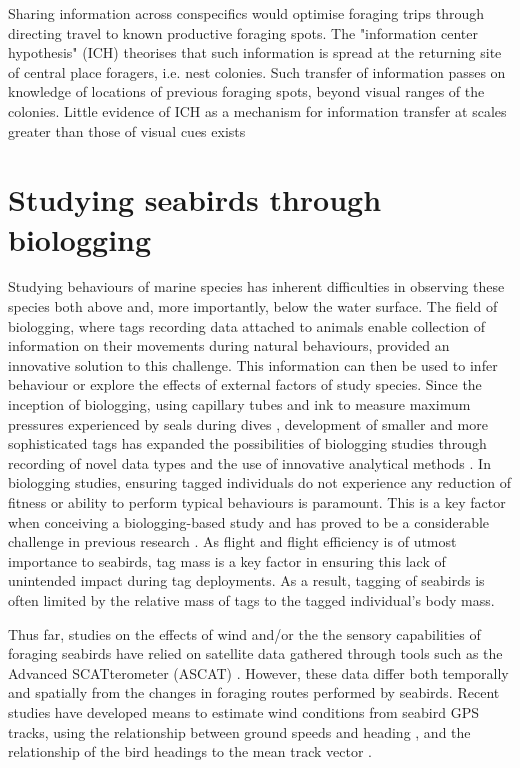 \documentclass[9pt,twocolumn,twoside,lineno]{pnas-new}
\begin{document}

Sharing information across conspecifics would optimise foraging trips through directing travel to known productive foraging spots. The "information center hypothesis" (ICH) theorises that such information is spread at the returning site of central place foragers, i.e. nest colonies. Such transfer of information passes on knowledge of locations of previous foraging spots, beyond visual ranges of the colonies. Little evidence of ICH as a mechanism for information transfer at scales greater than those of visual cues exists \citep{Davoren_2003} 

\section{Studying seabirds through biologging}
Studying behaviours of marine species has inherent difficulties in observing these species both above and, more importantly, below the water surface. The field of biologging, where tags recording data attached to animals enable collection of information on their movements during natural behaviours, provided an innovative solution to this challenge. This information can then be used to infer behaviour or explore the effects of external factors of study species. Since the inception of biologging, using capillary tubes and ink to measure maximum pressures experienced by seals during dives \citep{Kooyman_1965}, development of smaller and more sophisticated tags has expanded the possibilities of biologging studies through recording of novel data types and the use of innovative analytical methods \citep{Kooyman_2004}. In biologging studies, ensuring tagged individuals do not experience any reduction of fitness or ability to perform typical behaviours is paramount. This is a key factor when conceiving a biologging-based study and has proved to be a considerable challenge in previous research \citep{Gessaman_1988, Bowlin_2010}. As flight and flight efficiency is of utmost importance to seabirds, tag mass is a key factor in ensuring this lack of unintended impact during tag deployments. As a result, tagging of seabirds is often limited by the relative mass of tags to the tagged individual's body mass.

Thus far, studies on the effects of wind and/or the the sensory capabilities of foraging seabirds have relied on satellite data gathered through tools such as the Advanced SCATterometer (ASCAT) \citep{Bentamy2012}. However, these data differ both temporally and spatially from the changes in foraging routes performed by seabirds. Recent studies have developed means to estimate wind conditions from seabird GPS tracks, using the relationship between ground speeds and heading \citep{Yonehara_2016}, and the relationship of the bird headings to the mean track vector \citep{Goto_2017}.
\end{document}
